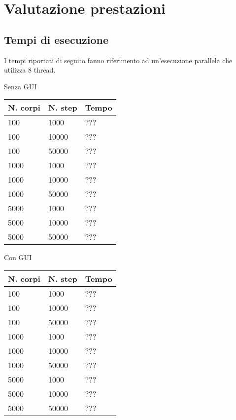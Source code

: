 \documentclass[12pt,a4paper,oneside,draft]{article}
\begin{document}
	\section{Valutazione prestazioni}
	\subsection{Tempi di esecuzione}
	I tempi riportati di seguito fanno riferimento ad un'esecuzione parallela che utilizza 8 thread.
	
	\hfill
	\begin{minipage}{.4\textwidth}
		Senza GUI
		
		\begin{tabular}{|l|l|l|}
			\hline
			\multicolumn{1}{|c|}{\textbf{N. corpi}} & \multicolumn{1}{c|}{\textbf{N. step}} & \multicolumn{1}{c|}{\textbf{Tempo}} \\ \hline
			100 & 1000 & ??? \\ \hline
			100 & 10000 & ??? \\ \hline
			100 & 50000 & ??? \\ \hline
			1000 & 1000 & ??? \\ \hline
			1000 & 10000 & ??? \\ \hline
			1000 & 50000 & ??? \\ \hline
			5000 & 1000 & ??? \\ \hline
			5000 & 10000 & ??? \\ \hline
			5000 & 50000 & ??? \\ \hline
		\end{tabular}
	\end{minipage}
	\hfill
	\begin{minipage}{.4\textwidth}
		Con GUI
		
		\begin{tabular}{|l|l|l|}
			\hline
			\multicolumn{1}{|c|}{\textbf{N. corpi}} & \multicolumn{1}{c|}{\textbf{N. step}} & \multicolumn{1}{c|}{\textbf{Tempo}} \\ \hline
			100 & 1000 & ??? \\ \hline
			100 & 10000 & ??? \\ \hline
			100 & 50000 & ??? \\ \hline
			1000 & 1000 & ??? \\ \hline
			1000 & 10000 & ??? \\ \hline
			1000 & 50000 & ??? \\ \hline
			5000 & 1000 & ??? \\ \hline
			5000 & 10000 & ??? \\ \hline
			5000 & 50000 & ??? \\ \hline
		\end{tabular}
	\end{minipage}
	\hfill
\end{document}
